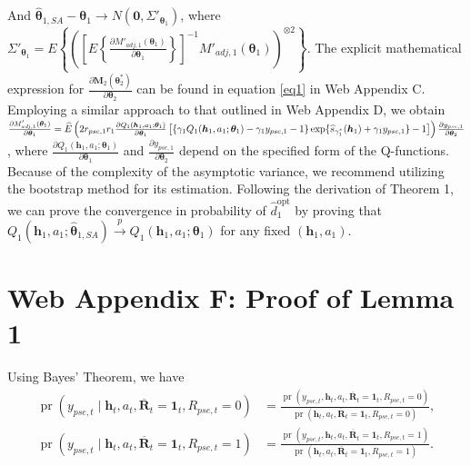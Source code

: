 \documentclass[12pt]{article}
\DeclareMathOperator{\pr}{pr}
\begin{document}
And $\widehat{\bm{\theta}}_{1,SA} - \bm{\theta}_1 \rightarrow N(\bm{0},\Sigma'_{\bm{\theta}_1} )$, where
$\Sigma'_{\bm{\theta}_1} = E\left\{\left(\left[E\left\{\frac{\partial M'_{adj,1}(\bm{\theta}_1)}{\partial \bm{\theta}_1} \right\}\right]^{-1} M'_{adj,1}(\bm{\theta}_1) \right)^{\otimes 2}\right\} $. The explicit mathematical expression for $\frac{\partial \bm{M}_2(\bm{\theta}_2^*)}{\partial \bm{\theta}_2}$ can be found in equation \eqref{eq1} in Web Appendix C. Employing a similar approach to that outlined in Web Appendix D, we obtain $\frac{\partial M'_{adj,1}(\bm{\theta}_1)}{\partial \bm{\theta}_1}  =\\ \widehat{E} \left( 2 r_{pse,1} r_1 \frac{\partial Q_1(\bm{h}_1,a_1;\bm{\theta}_1)}{\partial \bm{\theta}_1} \left[ \{ \gamma_1 Q_1(\bm{h}_1,a_1;\bm{\theta}_1) - \gamma_1 y_{pse,1}-1\} \exp\{\widehat{s}_{\gamma_1^*}(\bm{h}_1) + \gamma_1 y_{pse,1}\} -1 \right]\right) \frac{\partial y_{pse,1}}{\partial \bm{\theta}_2}$, where $\frac{\partial Q_1(\bm{h}_1,a_1;\bm{\theta}_1)}{\partial \bm{\theta}_1}$ and $\frac{\partial y_{pse,1}}{\partial \bm{\theta}_2}$ depend on the specified form of the Q-functions. Because of the complexity of the asymptotic variance, we recommend utilizing the bootstrap method for its estimation. Following the derivation of Theorem 1, we can prove the convergence in probability of $\widehat{d}^{\mathrm{opt}}_1$ by proving that $Q_1(\bm{h}_1,a_1;\widehat{\bm{\theta}}_{1, SA}) \stackrel{p}{\longrightarrow} Q_1(\bm{h}_1,a_1;\bm{\theta}_{1})$ for any fixed $(\bm{h}_1,a_1)$.

\section{Web Appendix F: Proof of Lemma 1}

Using  Bayes' Theorem, we have
\begin{align*}
    \pr(y_{pse,t}\mid \bm{h}_t,a_t,\overline{\bm{R}}_t = \bm{1}_t,R_{pse,t}=0) &= \frac{\pr(y_{pse,t},\bm{h}_t,a_t,\overline{\bm{R}}_t = \bm{1}_t,R_{pse,t}=0)}{\pr (\bm{h}_t,a_t,\overline{\bm{R}}_t = \bm{1}_t,R_{pse,t}=0)},\\
    \pr(y_{pse,t}\mid \bm{h}_t,a_t,\overline{\bm{R}}_t = \bm{1}_t,R_{pse,t}=1) &= \frac{\pr(y_{pse,t},\bm{h}_t,a_t,\overline{\bm{R}}_t = \bm{1}_t,R_{pse,t}=1)}{\pr (\bm{h}_t,a_t,\overline{\bm{R}}_t = \bm{1}_t,R_{pse,t}=1)} .
\end{align*}
\end{document}
